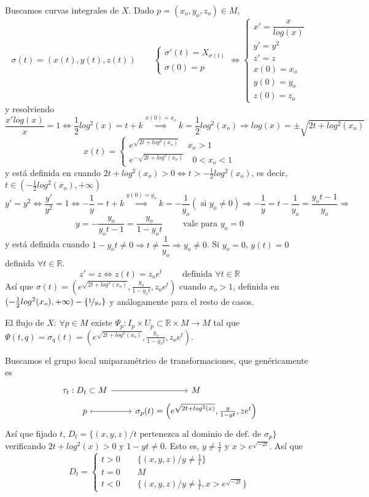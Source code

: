  \begin{sol}
     Buscamos curvas integrales de $X$. Dado $p=(x_o,y_o,z_o) \in M$, 
     $$\sigma(t)=(x(t),y(t),z(t)) \qquad \begin{cases}
         \sigma'(t)=X_{\sigma(t)} \\ \sigma(0)=p
     \end{cases}\iff \begin{cases}
         x'=\dfrac{x}{log(x)} \\ y'=y^2 \\ z'=z \\ x(0)=x_o \\ y(0)=y_o \\ z(0)=z_o
     \end{cases}$$ 
     y resolviendo
     $$\dfrac{x' log(x)}{x}=1 \iff \dfrac{1}{2} log^2(x) = t + k \overset{x(0)=x_o}{\implies} k = \dfrac{1}{2} log^2(x_o) \Rightarrow log(x) = \pm \sqrt{2t+log^2(x_o)}$$
     $$x(t)=\begin{cases}
         e^{\sqrt{2t+log^2(x_o)}} \quad x_o> 1\\e^{-\sqrt{2t+log^2(x_o)}} \quad 0 < x_o < 1
     \end{cases}$$y est\'a definida en cuando $2t+log^2(x_o) > 0 \iff t>-\frac{1}{2}log^2(x_o)$, es decir, $t\in (-\frac{1}{2}log^2(x_o), +\infty) $
     $$y'=y^2 \iff \dfrac{y'}{y^2}=1 \iff -\dfrac{1}{y} = t+k \overset{y(0)=y_o}{\implies} k = -\frac{1}{y_o} (\text{ si } y_o\neq 0) \Rightarrow -\dfrac{1}{y}=t-\dfrac{1}{y_o} = \dfrac{y_ot-1}{y_o} \Rightarrow$$
     $$y=-\dfrac{y_o}{y_ot-1}=\dfrac{y_o}{1-y_o t} \qquad \text{ vale para } y_o=0 $$
     y est\'a definida cuando $1-y_ot\neq 0 \Rightarrow t\neq \dfrac{1}{y_o} \Rightarrow y_o\neq 0$. Si $y_o=0$, $y(t)=0$ definida $\forall t \in \mathbb R$.
    $$z'=z \iff z(t)=z_oe^t \qquad \text{ definida } \forall t\in \mathbb R$$
    As\'i que $\sigma(t)=\left( e^{\sqrt{2t+log^2(x_o)}}, \frac{y_o}{1-y_ot},z_oe^t\right)$ cuando $x_o>1$, definida en $(-\frac{1}{2}log^2(x_o), +\infty) - \{\nicefrac{1}{y_o}\}$ y an\'alogamente para el resto de casos.

    El flujo de $X$: $\forall p \in M$ existe $\Psi_p: I_p \times U_p\subset \mathbb R \times M \longrightarrow M$ tal que $\Psi(t,q)=\sigma_q(t)=\left( e^{\sqrt{2t+log^2(x_o)}}, \frac{y_o}{1-y_ot},z_oe^t\right)$. 

    Buscamos el grupo local uniparam\'etrico de transformaciones, que gen\'ericamente es
    $$\bt \tau_t : D_t \subset M \rar & M\\[-5mm] p \arrow[mapsto]{r} & \sigma_p(t) =  \left( e^{\sqrt{2t+log^2(x)}}, \frac{y}{1-yt},ze^t\right) \et$$
    As\'i que fijado $t$, $D_t=\{(x,y,z) / t \text{ pertenezca al dominio de def. de } \sigma_p\}$ verificando $2t+log^2(x)>0$ y $1-y t\neq 0$. Esto es, $y\neq \frac{1}{t}$ y $x > e^{\sqrt{-2t}}$. As\'i que
    $$D_t = \begin{cases}
        t > 0 \qquad \{(x,y,z)/ y \neq \frac{1}{t}\} \\ t=0 \qquad M \\ t< 0 \qquad  \{(x,y,z)/ y \neq \frac{1}{t}, x> e^{\sqrt{-2t}}\}
    \end{cases}$$
 \end{sol}
